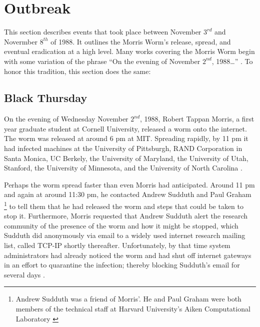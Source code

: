 \section*{Outbreak}
This section describes events that took place between November $3^{rd}$ and
Novermber $8^{th}$ of 1988. It outlines the Morris Worm's release, spread, and
eventual eradication at a high level.
Many works covering the Morris Worm begin with some variation of the phrase
``On the evening of November $2^{nd}$, 1988\ldots''
 \cite{seeley_tour_1989}
 \cite{spafford_crisis_1989}
 \cite{lee_washpost_2013}
 \cite{spafford_internet_1989-1}
 \cite{spafford_internet_1989}
 \cite{eichin_microscope_1989}.
To honor this tradition, this section does the same: 

\subsection*{Black Thursday}

On the evening of Wednesday November $2^{nd}$, 1988, Robert Tappan Morris, a
first year graduate student at Cornell University, released a worm onto the
internet. The worm was released at around 6 pm at MIT. Spreading rapidly, by 11
pm it had infected machines at
the University of Pittsburgh,
RAND Corporation in Santa Monica,
UC Berkely,
the University of Maryland,
the University of Utah,
Stanford,
the University of Minnesota,
and the University of North Carolina
\cite{seeley_tour_1989}
\cite{spafford_internet_1989-1}.

Perhaps the worm spread faster than even Morris had anticipated. Around
11 pm and again at around 11:30 pm, he contacted Andrew Sudduth and Paul Graham
\footnote{
Andrew Sudduth was a friend of Morris'. He and Paul Graham were both
members of the technical staff at Harvard University's Aiken Computational
Laboratory \cite{lee_washpost_2013}
}
to tell them that he had released the worm and steps that could be taken to stop
it. Furthermore, Morris requested that Andrew Sudduth alert the research
community of the presence of the worm and how it might be stopped, which
Sudduth did anonymously via email to a widely used internet research mailing
list, called TCP-IP shortly thereafter.
Unfortunately, by that time system administrators had already noticed the worm and had shut off
internet gateways in an effort to quarantine the infection; thereby blocking
Sudduth's email for several days
\cite{lee_washpost_2013}\cite{eisenberg_cornell_1989}.

